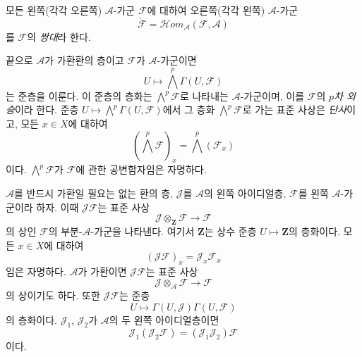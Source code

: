 \begin{env}[4.1.5]
모든 왼쪽(각각 오른쪽) $\mathcal A$-가군 $\mathcal F$에 대하여 오른쪽(각각 왼쪽) $\mathcal A$-가군
\[
  \check{\mathcal F}
  =\mathcal H\!om_{\mathcal A}(\mathcal F,\mathcal A)
\]
를 $\mathcal F$의 \emph{쌍대}라 한다.

끝으로 $\mathcal A$가 가환환의 층이고 $\mathcal F$가 $\mathcal A$-가군이면
\[
  U\longmapsto\bigwedge^p\Gamma(U,\mathcal F)
\]
는 준층을 이룬다. 이 준층의 층화는 $\bigwedge^p\mathcal F$로 나타내는 $\mathcal A$-가군이며, 이를 $\mathcal F$의 \emph{$p$차 외승}이라 한다. 준층 $U\mapsto\bigwedge^p\Gamma(U,\mathcal F)$에서 그 층화 $\bigwedge^p\mathcal F$로 가는 표준 사상은 \emph{단사}이고, 모든 $x\in X$에 대하여
\[
  (\bigwedge^p\mathcal F)_x
  =\bigwedge^p(\mathcal F_x)
\]
이다. $\bigwedge^p\mathcal F$가 $\mathcal F$에 관한 공변함자임은 자명하다.
\end{env}

\begin{env}[4.1.6]
\label{0.4.1.6-ko}
$\mathcal A$를 반드시 가환일 필요는 없는 환의 층, $\mathcal J$를 $\mathcal A$의 왼쪽 아이디얼층, $\mathcal F$를 왼쪽 $\mathcal A$-가군이라 하자. 이때 $\mathcal J\mathcal F$는 표준 사상
\[
  \mathcal J\otimes_{\mathbf Z}\mathcal F
  \longrightarrow\mathcal F
\]
의 상인 $\mathcal F$의 부분-$\mathcal A$-가군을 나타낸다. 여기서 $\mathbf Z$는 상수 준층 $U\mapsto\mathbf Z$의 층화이다. 모든 $x\in X$에 대하여
\[
  (\mathcal J\mathcal F)_x
  =\mathcal J_x\mathcal F_x
\]
임은 자명하다. $\mathcal A$가 가환이면 $\mathcal J\mathcal F$는 표준 사상
\[
  \mathcal J\otimes_{\mathcal A}\mathcal F
  \longrightarrow\mathcal F
\]
의 상이기도 하다. 또한 $\mathcal J\mathcal F$는 준층
\[
  U\longmapsto
  \Gamma(U,\mathcal J)\Gamma(U,\mathcal F)
\]
의 층화이다. $\mathcal J_1$, $\mathcal J_2$가 $\mathcal A$의 두 왼쪽 아이디얼층이면
\[
  \mathcal J_1(\mathcal J_2\mathcal F)
  =(\mathcal J_1\mathcal J_2)\mathcal F
\]
이다.
\end{env}

